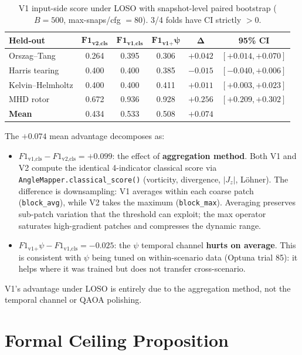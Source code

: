 \documentclass[12pt, a4paper, oneside]{report}
\begin{document}
\begin{table}[H]
\centering
\caption{V1 input-side score under LOSO with snapshot-level paired bootstrap ($B = 500$, max-snaps/cfg $= 80$). 3/4 folds have CI strictly $> 0$.}
\label{tab:v1-loso}
\begin{tabular}{lccccc}
\toprule
\textbf{Held-out} & $\bm{F1_\text{v2,cls}}$ & $\bm{F1_\text{v1,cls}}$ & $\bm{F1_\text{v1+}\psi}$ & $\bm{\Delta}$ & \textbf{95\% CI} \\
\midrule
Orszag--Tang & 0.264 & 0.395 & 0.306 & $+0.042$ & $[+0.014, +0.070]$ \\
Harris tearing & 0.400 & 0.400 & 0.385 & $-0.015$ & $[-0.040, +0.006]$ \\
Kelvin--Helmholtz & 0.400 & 0.400 & 0.411 & $+0.011$ & $[+0.003, +0.023]$ \\
MHD rotor & 0.672 & 0.936 & 0.928 & $+0.256$ & $[+0.209, +0.302]$ \\
\midrule
\textbf{Mean} & 0.434 & 0.533 & 0.508 & $\bm{+0.074}$ & \\
\bottomrule
\end{tabular}
\end{table}

The $+0.074$ mean advantage decomposes as:
\begin{itemize}
    \item $F1_\text{v1,cls} - F1_\text{v2,cls} = +0.099$: the effect of \textbf{aggregation method}. Both V1 and V2 compute the identical 4-indicator classical score via \texttt{AngleMapper.classical\_score()} (vorticity, divergence, $|J_z|$, L\"ohner). The difference is downsampling: V1 averages within each coarse patch (\texttt{block\_avg}), while V2 takes the maximum (\texttt{block\_max}). Averaging preserves sub-patch variation that the threshold can exploit; the max operator saturates high-gradient patches and compresses the dynamic range.
    \item $F1_\text{v1+}\psi - F1_\text{v1,cls} = -0.025$: the $\psi$ temporal channel \textbf{hurts on average}. This is consistent with $\psi$ being tuned on within-scenario data (Optuna trial 85): it helps where it was trained but does not transfer cross-scenario.
\end{itemize}

V1's advantage under LOSO is entirely due to the aggregation method, not the temporal channel or QAOA polishing.

\section{Formal Ceiling Proposition}
\label{sec:ceiling-proposition}
\end{document}

